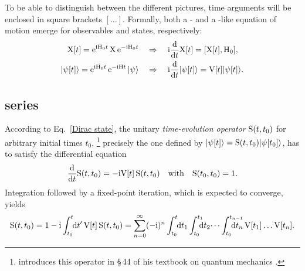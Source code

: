 To be able to distinguish between the different pictures, time arguments will be
enclosed in square brackets $[\dots]$. Formally, both a - and a
-like equation of motion emerge for observables and states,
respectively:
%
\begin{subequations}
    \begin{align}
        \label{Dirac operator}
        \mathrm X[t] = \mathrm e^{\mathrm i \mathrm H_0 t} \, \mathrm X \, \mathrm e^{-\mathrm i \mathrm H_0 t}
        \quad &\Rightarrow \quad
        \mathrm i \frac {\mathrm d} {\mathrm d t} \mathrm X[t] = [\mathrm X[t], \mathrm H_0],
        \\
        \label{Dirac state}
        |\psi[t]\rangle = \mathrm e^{\mathrm i \mathrm H_0 t} \, \mathrm e^{-\mathrm i \mathrm H t} \, |\psi\rangle
        \quad &\Rightarrow \quad
        \mathrm i \frac {\mathrm d} {\mathrm d t} |\psi[t]\rangle = \mathrm V[t] |\psi[t]\rangle.
    \end{align}
\end{subequations}

\subsection{ series}

According to Eq.~\ref{Dirac state}, the unitary \emph{time-evolution operator}
$\mathrm S(t, t_0)$ for arbitrary initial times $t_0$,%
%
\footnote{ introduces this operator in §\,44  of his textbook on quantum mechanics
\cite{Dirac58}.}
%
precisely the one defined by $|\psi[t]\rangle = \mathrm S(t, t_0) |\psi[t_0]\rangle$,
has to satisfy the differential equation
%
\begin{equation*}
    \frac {\mathrm d} {\mathrm d t} \mathrm S(t, t_0) = -\mathrm i \mathrm V[t] \, \mathrm S(t, t_0)
    \quad \text{with} \quad
    \mathrm S(t_0, t_0) = 1.
\end{equation*}
%
Integration followed by a fixed-point iteration, which is expected to converge,
yields
%
\begin{equation*}
    \op S(t, t_0) = 1 - \I \int \from{t_0} \till t \D t' \,
    \op V[t] \, \op S(t, t_0) =
    \sum_{n = 0}^\infty (-\I)^n
    \int \from{t_0} \till t \D t_1
    \int \from{t_0} \till{t_1} \D t_2 \dots
    \int \from{t_0} \till{t_{n - 1}} \D t_n \,
    \op V[t_1] \dots \op V[t_n].
\end{equation*}

